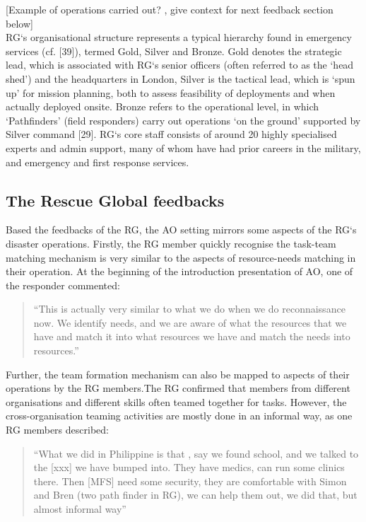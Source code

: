 [Example of operations carried out? , give context for next feedback section below]\\

RG`s organisational structure represents a typical hierarchy found in emergency services (cf. [39]), termed Gold, Silver and Bronze. Gold denotes the strategic lead, which is associated with RG`s senior officers (often referred to as the `head shed') and the headquarters in London, Silver is the tactical lead, which is `spun up' for mission planning, both to assess feasibility of deployments and when actually deployed onsite. Bronze refers to the operational level, in which `Pathfinders' (field responders) carry out operations `on the ground' supported by Silver command [29]. RG`s core staff consists of around 20 highly specialised experts and admin support, many of whom have had prior careers in the military, and emergency and first response services.\\


\subsection{The Rescue Global feedbacks}
Based the feedbacks of the RG, the AO setting  mirrors some aspects of the RG`s disaster operations. Firstly, the RG member quickly recognise the task-team matching mechanism is very similar to the aspects of resource-needs matching in their operation. At the beginning of the introduction presentation of AO, one of the responder commented: \\

\begin{quotation}
``This is actually very similar to what we do when we do reconnaissance now. We identify needs, and we are aware of what the resources that we have and match it into what resources we have and match the needs into resources.''\\
\end{quotation}

Further, the team formation mechanism can also be mapped to aspects of their operations by the RG members.The RG confirmed that members from different organisations and different skills often teamed together for tasks. However, the cross-organisation teaming activities are mostly done in an informal way, as one RG members described: \\

\begin{quotation}
``What we did in Philippine is that , say we found school, and we talked to the [xxx] we have bumped into. They have medics, can run some clinics there. Then [MFS] need some security, they are comfortable with Simon and Bren (two path finder in RG), we can help them out, we did that, but almost informal way'' \\
\end{quotation}

